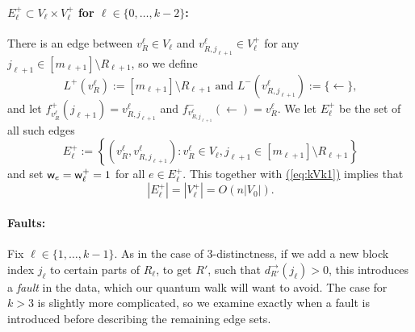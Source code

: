 \documentclass{article}
\newcommand{\eq}[1]{\hyperref[eq:#1]{(\ref*{eq:#1})}}
\renewcommand{\>}{\rangle}
\newcommand{\<}{\langle}
\renewcommand{\(}{\left(}
\renewcommand{\)}{\right)}
\def\abs#1{\left| #1 \right|}
\def\w{{\sf w}}
\begin{document}
\paragraph{$E_{\ell}^+\subset V_{\ell}\times V_{\ell}^+$ for $\ell \in \{0,\dots,k-2\}$:} There is an edge between $v^{\ell}_{R}\in V_{\ell}$ and $v^{\ell}_{R,j_{\ell+1}} \in V_{\ell}^+$ for any $j_{\ell+1}\in [m_{\ell+1}]\setminus R_{\ell+1}$, so we define
$$L^+(v^{\ell}_R):=[m_{\ell+1}]\setminus R_{\ell+1}
\mbox{ and }
L^-(v^{\ell}_{R,j_{\ell+1}}):=\{\leftarrow\},$$
and let $f^+_{v_R^{\ell}}(j_{\ell+1})=v_{R,j_{\ell+1}}^{\ell}$ and $f^-_{v_{R,j_{\ell+1}}^{\ell}}(\leftarrow)=v^{\ell}_R$. We let $E_{\ell}^+$ be the set of all such edges
$$E_{\ell}^{+}:=\left\{(v^{\ell}_{R},v^{\ell}_{R,j_{\ell+1}}):v^{\ell}_{R}\in V_{\ell}, j_{\ell+1}\in [m_{\ell+1}]\setminus R_{\ell+1}\right\}$$
and set $\w_e=\w_{\ell}^+=1$ for all $e\in E_{\ell}^+$.
This together with \eq{kVk1} implies that 
\begin{equation}
	\abs{E_{\ell}^+} = \abs{V_{\ell}^+} = O\left(n\abs{V_0}\right).\label{eq:kEk0}
\end{equation}



\paragraph{Faults:} Fix $\ell\in\{1,\dots,k-1\}$. As in the case of 3-distinctness, if we add a new block index $j_{\ell}$ to certain parts of $R_{\ell}$, to get $R'$, such that $d_{R'}^{\rightarrow}(j_{\ell})>0$, this introduces a \emph{fault} in the data, which our quantum walk will want to avoid. The case for $k>3$ is slightly more complicated, so we examine exactly when a fault is introduced before describing the remaining edge sets. 
\end{document}
